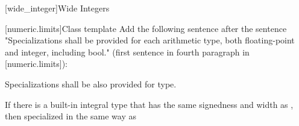 
[wide_integer]{Wide Integers}


%
[numeric.limits]{Class template }
Add the following sentence after the sentence "Specializations shall be provided for each arithmetic type, both floating-point and integer, including bool." (first sentence in fourth paragraph in [numeric.limits]):

\begin{addedblock}
Specializations shall be also provided for  type.

\begin{note}
If there is a built-in integral type  that has the same signedness and width as , then  specialized in the same way as 
\end{note}
\end{addedblock}

